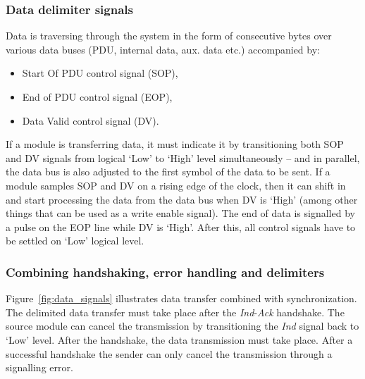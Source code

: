 \documentclass[conference]{IEEEtran}
\begin{document}
\subsubsection{Data delimiter signals}

Data is traversing through the system in the form of consecutive bytes over various data buses (PDU, internal data,
aux. data etc.) accompanied by:
\begin{itemize}
    \renewcommand \labelitemi{--}
    \item Start Of PDU control signal (SOP),
    \item End of PDU control signal (EOP),
    \item Data Valid control signal (DV).
\end{itemize}
If a module is transferring data, it must indicate it by transitioning both SOP and DV signals from logical `Low' to
`High' level simultaneously -- and in parallel, the data bus is also adjusted to the first symbol of the data to be
sent.
If a module samples SOP and DV on a rising edge of the clock, then it can shift in and start processing the data from
the data bus when DV is `High' (among other things that can be used as a write enable signal).
The end of data is signalled by a pulse on the EOP line while DV is `High'. After this, all control signals have to be
settled on `Low' logical level.

\subsubsection{Combining handshaking, error handling and delimiters}

Figure~\ref{fig:data_signals} illustrates data transfer combined with synchronization. The delimited data transfer must
take place after the \emph{Ind}-\emph{Ack} handshake.
The source module can cancel the transmission by transitioning the \emph{Ind} signal back to `Low' level. After the
handshake, the data transmission must take place. After a successful handshake the sender can only cancel the
transmission through a signalling error.
\end{document}
